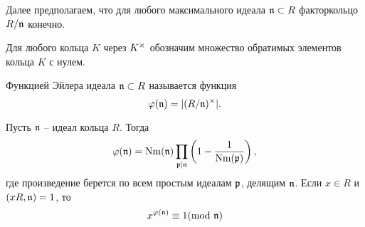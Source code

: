 \documentclass[_00_dissertation.tex]{subfiles}
\begin{document}
Далее предполагаем, что для любого  максимального идеала $\mathfrak{n} \subset R$ факторкольцо $R/\mathfrak{n}$ конечно.

Для любого кольца $K$ через $K^{\times}$ обозначим множество обратимых элементов кольца $K$ с нулем.

\begin{definition}
    Функцией Эйлера идеала $\mathfrak{n} \subset R$ называется функция
    \begin{equation*}
        \varphi(\mathfrak{n}) = |(R/\mathfrak{n})^{\times}|.
    \end{equation*}
\end{definition}

    


\begin{statement}\cite{Narkiewicz}\label{statement:euler_function}
    Пусть $\mathfrak{n}$ -- идеал кольца $R$.
    Тогда
    \begin{equation*}
        \varphi(\mathfrak{n}) = \textrm{Nm}(\mathfrak{n}) \prod_{\mathfrak{p} | \mathfrak{n}} \left(
            1 - \frac{1}{\textrm{Nm}(\mathfrak{p})}
        \right),
    \end{equation*}
    где произведение берется по всем простым идеалам $\mathfrak{p}$, делящим $\mathfrak{n}$.
    Если $x \in R$ и $(xR, \mathfrak{n}) = 1$, то
    \begin{equation*}
        x^{\varphi(\mathfrak{n})} \equiv 1 (\textrm{mod } \mathfrak{n})
    \end{equation*}
\end{statement}
\end{document}
